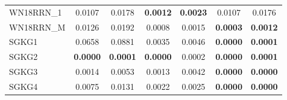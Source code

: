 \begin{table}[t]
{\begin{tabular}{l||cc||cc||cc}
WN18RRN\_1 & 0.0107 & 0.0178 & \textbf{0.0012} & \textbf{0.0023} & 0.0107 & 0.0176 \\
WN18RRN\_M & 0.0126 & 0.0192 & 0.0008 & 0.0015 & \textbf{0.0003} & \textbf{0.0012} \\
\hline
SGKG1 & 0.0658 & 0.0881 & 0.0035 & 0.0046 & \textbf{0.0000} & \textbf{0.0001} \\
SGKG2 & \textbf{0.0000} & \textbf{0.0001} & \textbf{0.0000} & 0.0002 & \textbf{0.0000} & \textbf{0.0001} \\
SGKG3 & 0.0014 & 0.0053 & 0.0013 & 0.0042 & \textbf{0.0000} & \textbf{0.0000} \\
SGKG4 & 0.0075 & 0.0131 & 0.0022 & 0.0025 & \textbf{0.0000} & \textbf{0.0000} \\
\hline
\end{tabular}%
}
\end{table}
